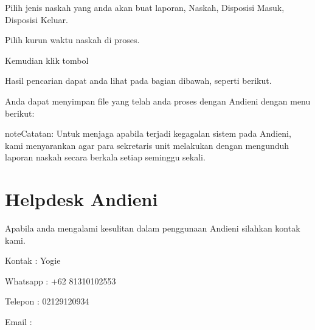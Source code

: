 \documentclass[letterpaper,10pt,bahasai]{sphinxmanual}
\begin{document}
Pilih jenis naskah yang anda akan buat laporan, Naskah, Disposisi Masuk, Disposisi Keluar.

\noindent{}

Pilih kurun waktu naskah di proses.

\noindent{}

Kemudian klik tombol 

\noindent{}

Hasil pencarian dapat anda lihat pada bagian dibawah, seperti berikut.

\noindent{}

Anda dapat menyimpan file yang telah anda proses dengan Andieni dengan menu berikut:

\noindent{}

\begin{sphinxadmonition}{note}{Catatan:}
Untuk menjaga apabila terjadi kegagalan sistem pada Andieni, kami menyarankan agar para sekretaris unit melakukan  dengan mengunduh laporan naskah secara berkala setiap seminggu sekali.
\end{sphinxadmonition}


\chapter{Helpdesk Andieni}
\label{\detokenize{index:helpdesk-andieni}}
Apabila anda mengalami kesulitan dalam penggunaan Andieni silahkan kontak kami.

\begin{DUlineblock}{0em}
\item[] Kontak   : Yogie
\item[] Whatsapp : +62 813\sphinxhyphen{}1010\sphinxhyphen{}2553
\item[] Telepon  : 021\sphinxhyphen{}29120934
\item[] Email    : 
\end{DUlineblock}



\renewcommand{\indexname}{Indeks}
\printindex
\end{document}
